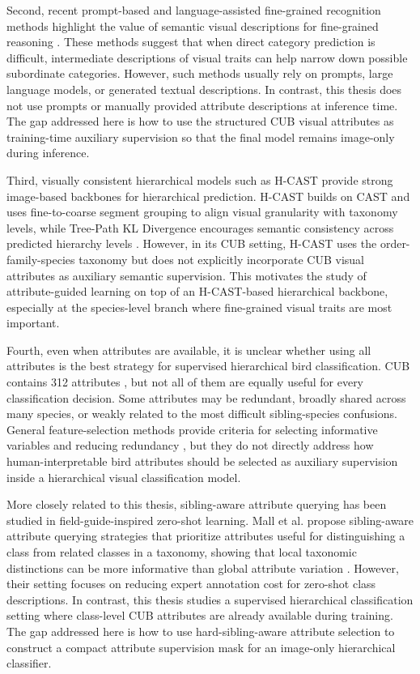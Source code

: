 Second, recent prompt-based and language-assisted fine-grained recognition methods highlight the value of semantic visual descriptions for fine-grained reasoning \cite{liu2024democratizing}. These methods suggest that when direct category prediction is difficult, intermediate descriptions of visual traits can help narrow down possible subordinate categories. However, such methods usually rely on prompts, large language models, or generated textual descriptions. In contrast, this thesis does not use prompts or manually provided attribute descriptions at inference time. The gap addressed here is how to use the structured CUB visual attributes as training-time auxiliary supervision so that the final model remains image-only during inference.

Third, visually consistent hierarchical models such as H-CAST provide strong image-based backbones for hierarchical prediction. H-CAST builds on CAST and uses fine-to-coarse segment grouping to align visual granularity with taxonomy levels, while Tree-Path KL Divergence encourages semantic consistency across predicted hierarchy levels \cite{ke2024learning, park2025visually}. However, in its CUB setting, H-CAST uses the order-family-species taxonomy but does not explicitly incorporate CUB visual attributes as auxiliary semantic supervision. This motivates the study of attribute-guided learning on top of an H-CAST-based hierarchical backbone, especially at the species-level branch where fine-grained visual traits are most important.

Fourth, even when attributes are available, it is unclear whether using all attributes is the best strategy for supervised hierarchical bird classification. CUB contains 312 attributes \cite{wah2011cub}, but not all of them are equally useful for every classification decision. Some attributes may be redundant, broadly shared across many species, or weakly related to the most difficult sibling-species confusions. General feature-selection methods provide criteria for selecting informative variables and reducing redundancy \cite{peng2005feature, kira1992practical, kononenko1994estimating}, but they do not directly address how human-interpretable bird attributes should be selected as auxiliary supervision inside a hierarchical visual classification model.

More closely related to this thesis, sibling-aware attribute querying has been studied in field-guide-inspired zero-shot learning. Mall et al. propose sibling-aware attribute querying strategies that prioritize attributes useful for distinguishing a class from related classes in a taxonomy, showing that local taxonomic distinctions can be more informative than global attribute variation \cite{mall2021field}. However, their setting focuses on reducing expert annotation cost for zero-shot class descriptions. In contrast, this thesis studies a supervised hierarchical classification setting where class-level CUB attributes are already available during training. The gap addressed here is how to use hard-sibling-aware attribute selection to construct a compact attribute supervision mask for an image-only hierarchical classifier.

